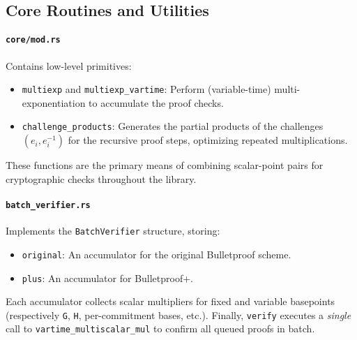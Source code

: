 \documentclass[12pt,a4paper]{article}
\begin{document}
\subsection{Core Routines and Utilities}

\paragraph{\texttt{core/mod.rs}}
Contains low-level primitives:
\begin{itemize}
    \item \texttt{multiexp} and \texttt{multiexp\_vartime}: Perform (variable-time) multi-exponentiation to accumulate the proof checks. %
    \item \texttt{challenge\_products}: Generates the partial products of the challenges $(e_i, e_i^{-1})$ for the recursive proof steps, optimizing repeated multiplications. %
\end{itemize}

These functions are the primary means of combining scalar-point pairs for cryptographic checks throughout the library.

\paragraph{\texttt{batch\_verifier.rs}}
Implements the \texttt{BatchVerifier} structure, storing:
\begin{itemize}
    \item \texttt{original}: An accumulator for the original Bulletproof scheme. %
    \item \texttt{plus}: An accumulator for Bulletproof+. %
\end{itemize}

Each accumulator collects scalar multipliers for fixed and variable basepoints (respectively \texttt{G}, \texttt{H}, per-commitment bases, etc.).  Finally, \texttt{verify} executes a \emph{single} call to \texttt{vartime\_multiscalar\_mul} to confirm all queued proofs in batch.
\end{document}
